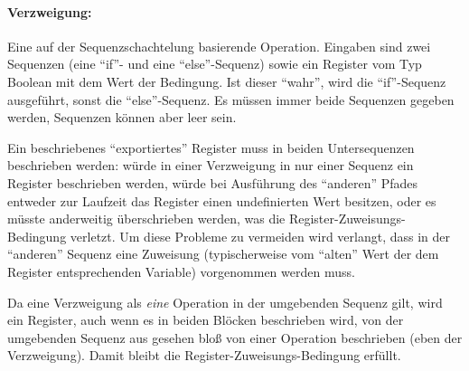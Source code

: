 \documentclass[twoside,a4paper,fleqn,12pt]{book}
\begin{document}

\paragraph{Verzweigung:} Eine auf der Sequenzschachtelung basierende Operation. Eingaben sind zwei Sequenzen (eine ``if''- und eine ``else''-Sequenz) sowie ein Register vom
Typ Boolean mit dem Wert der Bedingung. Ist dieser "`wahr"', wird die ``if''-Sequenz ausgeführt, sonst die ``else''-Sequenz. Es müssen immer beide Sequenzen
gegeben werden, Sequenzen können aber leer sein.

Ein beschriebenes "`exportiertes"' Register muss in beiden Untersequenzen beschrieben werden: würde in einer Verzweigung
in nur einer Sequenz ein Register beschrieben werden, würde bei Ausführung des "`anderen"' Pfades entweder zur Laufzeit das Register einen undefinierten Wert besitzen, oder
es müsste anderweitig überschrieben werden, was die Register-Zuweisungs-Bedingung verletzt. Um diese Probleme zu vermeiden wird verlangt,
dass in der "`anderen"' Sequenz eine Zuweisung (typischerweise vom "`alten"' Wert der dem Register entsprechenden Variable) vorgenommen werden muss.

Da eine Verzweigung als \emph{eine} Operation in der umgebenden Sequenz gilt, wird ein Register, auch wenn es in beiden Blöcken beschrieben wird, 
von der umgebenden Sequenz aus gesehen bloß von einer Operation beschrieben (eben der Verzweigung). Damit bleibt die Register-Zuweisungs-Bedingung erfüllt.


\end{document}
